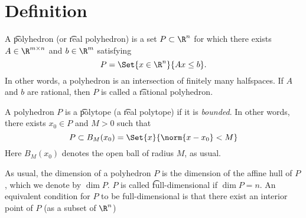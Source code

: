 

\section*{Definition}

A \t{polyhedron} (or \t{real polyhedron}) is a set $P \subset \R ^n$ for which there exists $A \in \R ^{m \times  n}$ and $b \in \R ^{m}$ satisfying
\[
P = \Set{x \in \R ^n}{Ax \leq b}.
\]
In other words, a polyhedron is an intersection of finitely many halfspaces.
If $A$ and $b$ are rational, then $P$ is called a \t{rational polyhedron}.

A polyhedron $P$ is a \t{polytope} (a \t{real polytope}) if it is \textit{bounded}.
In other words, there exists $x_0 \in P$ and $M > 0$ such that
\[
P \subset B_M(x_0) = \Set{x }{\norm{x - x_0} < M}
\]
Here $B_M(x_0)$ denotes the open ball of radius $M$, as usual.

As usual, the dimension of a polyhedron $P$ is the dimension of the affine hull of $P$, which we denote by $\dim P$.
$P$ is called \t{full-dimensional} if $\dim P = n$.
An equivalent condition for $P$ to be full-dimensional is that there exist an interior point of $P$ (as a subset of $\R ^n$)


\blankpage